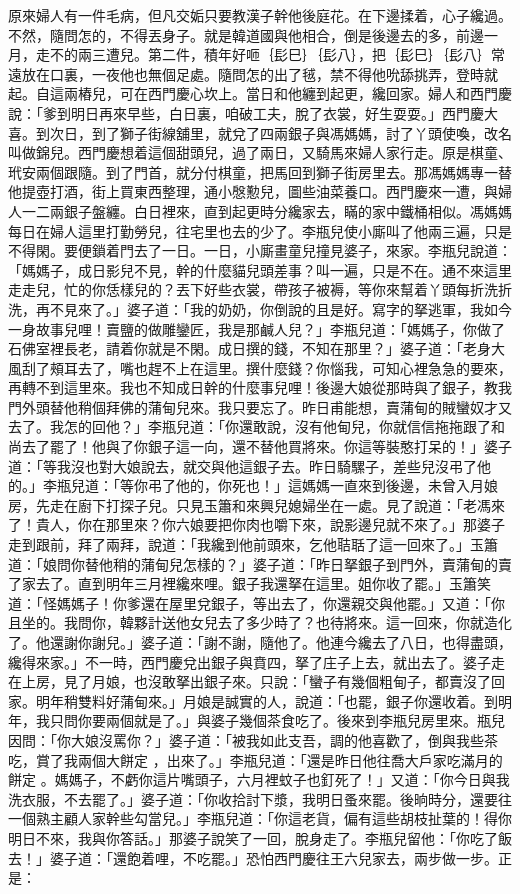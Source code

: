 \begin{showcontents}{}
原來婦人有一件毛病，但凡交姤只要教漢子幹他後庭花。在下邊揉着，心子纔過。不然，隨問怎的，不得丟身子。就是韓道國與他相合，倒是後邊去的多，前邊一月，走不的兩三遭兒。第二件，積年好咂｛髟巳｝｛髟八｝，把｛髟巳｝｛髟八｝常遠放在口裏，一夜他也無個足處。隨問怎的出了毧，禁不得他吮舔挑弄，登時就起。自這兩樁兒，可在西門慶心坎上。當日和他纏到起更，纔回家。婦人和西門慶說：「爹到明日再來早些，白日裏，咱破工夫，脫了衣裳，好生耍耍。」西門慶大喜。到次日，到了獅子街線舖里，就兌了四兩銀子與馮媽媽，討了丫頭使喚，改名叫做錦兒。西門慶想着這個甜頭兒，過了兩日，又騎馬來婦人家行走。原是棋童、玳安兩個跟隨。到了門首，就分付棋童，把馬回到獅子街房里去。那馮媽媽專一替他提壺打酒，街上買東西整理，通小慇懃兒，圖些油菜養口。西門慶來一遭，與婦人一二兩銀子盤纏。白日裡來，直到起更時分纔家去，瞞的家中鐵桶相似。馮媽媽每日在婦人這里打勤勞兒，往宅里也去的少了。李瓶兒使小廝叫了他兩三遍，只是不得閑。要便鎖着門去了一日。一日，小廝畫童兒撞見婆子，來家。李瓶兒說道：「媽媽子，成日影兒不見，幹的什麼貓兒頭差事？叫一遍，只是不在。通不來這里走走兒，忙的你恁樣兒的？丟下好些衣裳，帶孩子被褥，等你來幫着丫頭每折洗折洗，再不見來了。」婆子道：「我的奶奶，你倒說的且是好。寫字的拏逃軍，我如今一身故事兒哩！賣鹽的做雕鑾匠，我是那鹹人兒？」李瓶兒道：「媽媽子，你做了石佛室裡長老，請着你就是不閑。成日撰的錢，不知在那里？」婆子道：「老身大風刮了頰耳去了，嘴也趕不上在這里。撰什麼錢？你惱我，可知心裡急急的要來，再轉不到這里來。我也不知成日幹的什麼事兒哩！後邊大娘從那時與了銀子，教我門外頭替他稍個拜佛的蒲甸兒來。我只要忘了。昨日甫能想，賣蒲甸的賊蠻奴才又去了。我怎的回他？」李瓶兒道：「你還敢說，沒有他甸兒，你就信信拖拖跟了和尚去了罷了！他與了你銀子這一向，還不替他買將來。你這等裝憨打呆的！」婆子道：「等我沒也對大娘說去，就交與他這銀子去。昨日騎騾子，差些兒沒弔了他的。」李瓶兒道：「等你弔了他的，你死也！」這媽媽一直來到後邊，未曾入月娘房，先走在廚下打探子兒。只見玉簫和來興兒媳婦坐在一處。見了說道：「老馮來了！貴人，你在那里來？你六娘要把你肉也嚼下來，說影邊兒就不來了。」那婆子走到跟前，拜了兩拜，說道：「我纔到他前頭來，乞他聐聒了這一回來了。」玉簫道：「娘問你替他稍的蒲甸兒怎樣的？」婆子道：「昨日拏銀子到門外，賣蒲甸的賣了家去了。直到明年三月裡纔來哩。銀子我還拏在這里。姐你收了罷。」玉簫笑道：「怪媽媽子！你爹還在屋里兌銀子，等出去了，你還親交與他罷。」又道：「你且坐的。我問你，韓夥計送他女兒去了多少時了？也待將來。這一回來，你就造化了。他還謝你謝兒。」婆子道：「謝不謝，隨他了。他連今纔去了八日，也得盡頭，纔得來家。」不一時，西門慶兌出銀子與賁四，拏了庄子上去，就出去了。婆子走在上房，見了月娘，也沒敢拏出銀子來。只說：「蠻子有幾個粗甸子，都賣沒了回家。明年稍雙料好蒲甸來。」月娘是誠實的人，說道：「也罷，銀子你還收着。到明年，我只問你要兩個就是了。」與婆子幾個茶食吃了。後來到李瓶兒房里來。瓶兒因問：「你大娘沒罵你？」婆子道：「被我如此支吾，調的他喜歡了，倒與我些茶吃，賞了我兩個大餅定 ，出來了。」李瓶兒道：「還是昨日他往喬大戶家吃滿月的餅定 。媽媽子，不虧你這片嘴頭子，六月裡蚊子也釘死了！」又道：「你今日與我洗衣服，不去罷了。」婆子道：「你收拾討下漿，我明日蚤來罷。後晌時分，還要往一個熟主顧人家幹些勾當兒。」李瓶兒道：「你這老貨，偏有這些胡枝扯葉的！得你明日不來，我與你答話。」那婆子說笑了一回，脫身走了。李瓶兒留他：「你吃了飯去！」婆子道：「還飽着哩，不吃罷。」恐怕西門慶往王六兒家去，兩步做一步。正是：


\end{showcontents}
